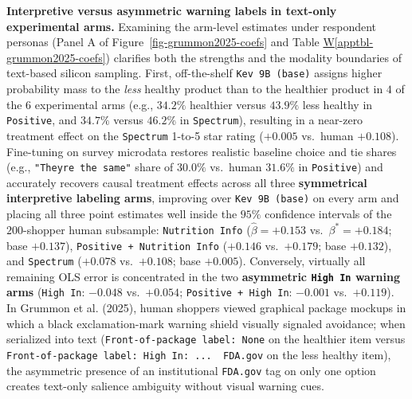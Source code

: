 \documentclass[
  letterpaper,
  DIV=11,
  numbers=noendperiod]{scrartcl}
\newcommand*\quartoapptblref[1]{Table \hyperref[#1]{W\ref{#1}}}
\begin{document}
\textbf{Interpretive versus asymmetric warning labels in text-only
experimental arms.} Examining the arm-level estimates under respondent
personas (Panel A of Figure~\ref{fig-grummon2025-coefs} and
\quartoapptblref{apptbl-grummon2025-coefs}) clarifies both the strengths
and the modality boundaries of text-based silicon sampling. First,
off-the-shelf \texttt{Kev\ 9B\ (base)} assigns higher probability mass
to the \emph{less} healthy product than to the healthier product in
\(4\) of the \(6\) experimental arms (e.g., \(34.2\%\) healthier versus
\(43.9\%\) less healthy in \texttt{Positive}, and \(34.7\%\) versus
\(46.2\%\) in \texttt{Spectrum}), resulting in a near-zero treatment
effect on the \texttt{Spectrum} 1-to-5 star rating (\(+0.005\) vs.~human
\(+0.108\)). Fine-tuning on survey microdata restores realistic baseline
choice and tie shares (e.g.,
\texttt{"They\textquotesingle{}re\ the\ same"} share of \(30.0\%\)
vs.~human \(31.6\%\) in \texttt{Positive}) and accurately recovers
causal treatment effects across all three \textbf{symmetrical
interpretive labeling arms}, improving over \texttt{Kev\ 9B\ (base)} on
every arm and placing all three point estimates well inside the \(95\%\)
confidence intervals of the \(200\)-shopper human subsample:
\texttt{Nutrition\ Info} (\(\hat{\beta} = +0.153\)
vs.~\(\beta^* = +0.184\); base \(+0.137\)),
\texttt{Positive\ +\ Nutrition\ Info} (\(+0.146\) vs.~\(+0.179\); base
\(+0.132\)), and \texttt{Spectrum} (\(+0.078\) vs.~\(+0.108\); base
\(+0.005\)). Conversely, virtually all remaining OLS error is
concentrated in the two \textbf{asymmetric \texttt{High\ In} warning
arms} (\texttt{High\ In}: \(-0.048\) vs.~\(+0.054\);
\texttt{Positive\ +\ High\ In}: \(-0.001\) vs.~\(+0.119\)). In Grummon
et al. (2025), human shoppers viewed graphical package mockups in which
a black exclamation-mark warning shield visually signaled avoidance;
when serialized into text (\texttt{Front-of-package\ label:\ None} on
the healthier item versus
\texttt{Front-of-package\ label:\ High\ In:\ ...\ \textbar{}\ FDA.gov}
on the less healthy item), the asymmetric presence of an institutional
\texttt{FDA.gov} tag on only one option creates text-only salience
ambiguity without visual warning cues.
\end{document}
